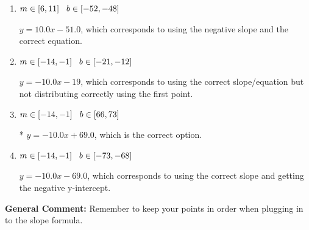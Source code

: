 \documentclass{extbook}[14pt]
\begin{document}
\begin{enumerate}
{\begin{enumerate}[label=\Alph*.]
 $y = -10.0x + 3$, which corresponds to using the correct slope/equation but not distributing correctly using the second point.
\item \( m \in [6, 11] \hspace*{3mm} b \in [-52, -48] \)

 $y = 10.0x -51.0$, which corresponds to using the negative slope and the correct equation.
\item \( m \in [-14, -1] \hspace*{3mm} b \in [-21, -12] \)

 $y = -10.0x -19$, which corresponds to using the correct slope/equation but not distributing correctly using the first point.
\item \( m \in [-14, -1] \hspace*{3mm} b \in [66, 73] \)

* $y = -10.0x + 69.0$, which is the correct option.
\item \( m \in [-14, -1] \hspace*{3mm} b \in [-73, -68] \)

 $y = -10.0x -69.0$, which corresponds to using the correct slope and getting the negative y-intercept.
\end{enumerate}

\textbf{General Comment:} Remember to keep your points in order when plugging in to the slope formula.
}
\end{enumerate}
\end{document}
